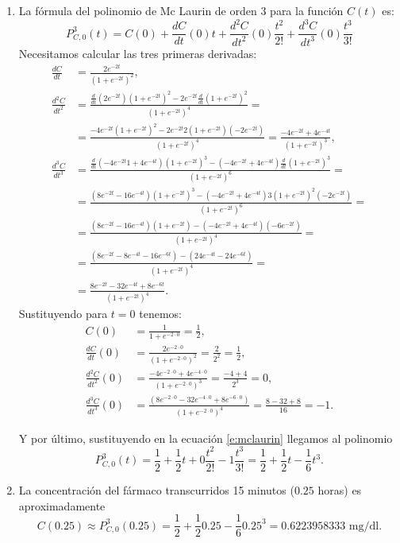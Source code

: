 {\begin{enumerate}
\item
La fórmula del polinomio de Mc Laurin de orden 3 para la función $C(t)$ es:
\begin{equation}
\label{e:mclaurin}
P_{C,0}^3(t)=C(0)+\frac{dC}{dt}(0)t+\frac{d^2C}{dt^2}(0)\frac{t^2}{2!}+\frac{d^3C}{dt^3}(0)\frac{t^3}{3!}
\end{equation}
Necesitamos calcular las tres primeras derivadas:
\begin{align*}
\frac{dC}{dt} &= \frac{2e^{-2t}}{(1+e^{-2t})^2},\\
\frac{d^2C}{dt^2} &=
\frac{\frac{d}{dt}(2e^{-2t})(1+e^{-2t})^2-2e^{-2t}\frac{d}{dt}(1+e^{-2t})^2}{(1+e^{-2t})^4} =\\
&= \frac{-4e^{-2t}(1+e^{-2t})^2- 2e^{-2t}2(1+e^{-2t})(-2e^{-2t})}{(1+e^{-2t})^4}
= \frac{-4e^{-2t}+4e^{-4t}}{(1+e^{-2t})^3},\\
\frac{d^3C}{dt^3}
&=
\frac{\frac{d}{dt}(-4e^{-2t}1+4e^{-4t})(1+e^{-2t})^3-(-4e^{-2t}+4e^{-4t})\frac{d}{dt}(1+e^{-2t})^3}{(1+e^{-2t})^6}=\\
&=
\frac{(8e^{-2t}-16e^{-4t})(1+e^{-2t})^3-(-4e^{-2t}+4e^{-4t})3(1+e^{-2t})^2(-2e^{-2t})}{(1+e^{-2t})^6}=\\
&=
\frac{(8e^{-2t}-16e^{-4t})(1+e^{-2t})-(-4e^{-2t}+4e^{-4t})(-6e^{-2t})}{(1+e^{-2t})^4}=\\
&=
\frac{(8e^{-2t}-8e^{-4t}-16e^{-6t})-(24e^{-4t}-24e^{-6t})}{(1+e^{-2t})^4}=\\
&=
\frac{8e^{-2t}-32e^{-4t}+8e^{-6t}}{(1+e^{-2t})^4}.
\end{align*}
Sustituyendo para $t=0$ tenemos:
\begin{align*}
C(0)&= \frac{1}{1+e^{-2\cdot 0}}=\frac{1}{2},\\
\frac{dC}{dt}(0) &= \frac{2e^{-2\cdot 0}}{(1+e^{-2\cdot 0})^2} = \frac{2}{2^2}=\frac{1}{2},\\
\frac{d^2C}{dt^2}(0) &= \frac{-4e^{-2\cdot 0}+4e^{-4\cdot 0}}{(1+e^{-2\cdot
0})^3} = \frac{-4+4}{2^3}= 0,\\
\frac{d^3C}{dt^3}(0)&=\frac{(8e^{-2\cdot 0}-32e^{-4\cdot 0}+8e^{-6\cdot 0})}{(1+e^{-2\cdot 0})^4}=\frac{8-32+8}{16}=-1.
\end{align*}

Y por último, sustituyendo en la ecuación \ref{e:mclaurin} llegamos al polinomio
\[
P_{C,0}^3(t)=\frac{1}{2}+\frac{1}{2}t+0\frac{t^2}{2!}-1\frac{t^3}{3!}=\frac{1}{2}+\frac{1}{2}t-\frac{1}{6}t^3.
\]

\item La concentración del fármaco transcurridos 15 minutos ($0.25$ horas) es aproximadamente
\[
C(0.25)\approx P_{C,0}^3(0.25)= \frac{1}{2}+\frac{1}{2}0.25-\frac{1}{6}0.25^3= 0.6223958333 \mbox{ mg/dl}.
\]
\end{enumerate}
}


